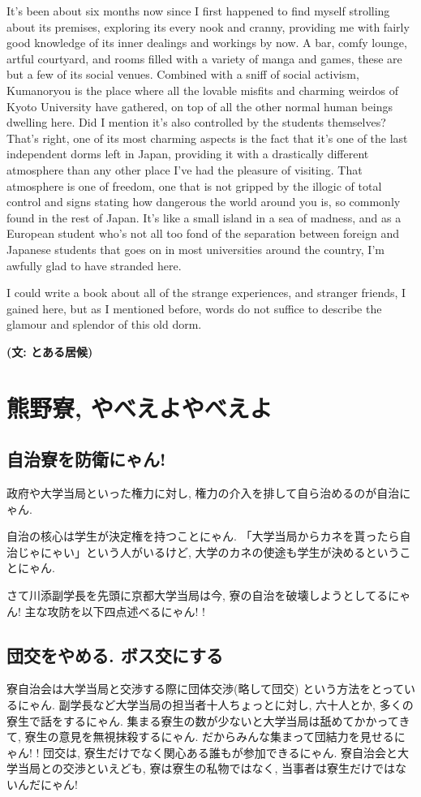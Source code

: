 \documentclass[10pt,b5jsbook,dvips,dvipdfmx,openany]{jsbook}
\theoremstyle{definition}
\begin{document}
		It's been about six months now since I first happened to find myself strolling about its premises, exploring its every nook and cranny, providing me with fairly good knowledge of its inner dealings and workings by now. A bar, comfy lounge, artful courtyard, and rooms filled with a variety of manga and games, these are but a few of its social venues. Combined with a sniff of social activism, Kumanoryou is the place where all the lovable misfits and charming weirdos of Kyoto University have gathered, on top of all the other normal human beings dwelling here. Did I mention it's also controlled by the students themselves? That's right, one of its most charming aspects is the fact that it's one of the last independent dorms left in Japan, providing it with a drastically different atmosphere than any other place I've had the pleasure of visiting. That atmosphere is one of freedom, one that is not gripped by the illogic of total control and signs stating how dangerous the world around you is, so commonly found in the rest of Japan. It's like a small island in a sea of madness, and as a European student who's not all too fond of the separation between foreign and Japanese students that goes on in most universities around the country, I'm awfully glad to have stranded here.

		I could write a book about all of the strange experiences, and stranger friends, I gained here, but as I mentioned before, words do not suffice to describe the glamour and splendor of this old dorm.

{\bf (文: とある居候)}


		\section{熊野寮, やべえよやべえよ}

			\subsection{自治寮を防衛にゃん! }
			政府や大学当局といった権力に対し, 権力の介入を排して自ら治めるのが自治にゃん.

			自治の核心は学生が決定権を持つことにゃん. 「大学当局からカネを貰ったら自治じゃにゃい」という人がいるけど, 大学のカネの使途も学生が決めるということにゃん.

			さて川添副学長を先頭に京都大学当局は今, 寮の自治を破壊しようとしてるにゃん! 主な攻防を以下四点述べるにゃん! !

			\subsection{団交をやめる. ボス交にする}
			寮自治会は大学当局と交渉する際に団体交渉(略して団交) という方法をとっているにゃん. 副学長など大学当局の担当者十人ちょっとに対し, 六十人とか, 多くの寮生で話をするにゃん. 集まる寮生の数が少ないと大学当局は舐めてかかってきて, 寮生の意見を無視抹殺するにゃん. だからみんな集まって団結力を見せるにゃん! ! 団交は, 寮生だけでなく関心ある誰もが参加できるにゃん. 寮自治会と大学当局との交渉といえども, 寮は寮生の私物ではなく, 当事者は寮生だけではないんだにゃん!
\end{document}
